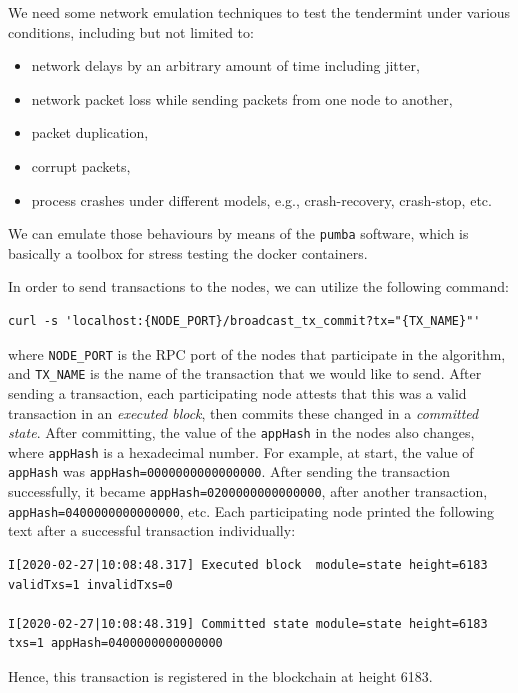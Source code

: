 \documentclass{article}
\begin{document}
We need some network emulation techniques to test the tendermint under various conditions, including but not limited to:

\begin{itemize}
    \item network delays by an arbitrary amount of time including jitter,
    \item network packet loss while sending packets from one node to another,
    \item packet duplication,
    \item corrupt packets,
    \item process crashes under different models, e.g., crash-recovery, crash-stop, etc.
\end{itemize}

We can emulate those behaviours by means of the \texttt{pumba} software, which is basically a toolbox for stress testing the docker containers.

In order to send transactions to the nodes, we can utilize the following command:

\begin{lstlisting}
curl -s 'localhost:{NODE_PORT}/broadcast_tx_commit?tx="{TX_NAME}"'
\end{lstlisting}

where \texttt{NODE\_PORT} is the RPC port of the nodes that participate in the algorithm, and \texttt{TX\_NAME} is the name of the transaction that we would like to send. After sending a transaction, each participating node attests that this was a valid transaction in an \textit{executed block}, then commits these changed in a \textit{committed state}. After committing, the value of the \texttt{appHash} in the nodes also changes, where \texttt{appHash} is a hexadecimal number. For example, at start, the value of \texttt{appHash} was \texttt{appHash=0000000000000000}. After sending the transaction successfully, it became \texttt{appHash=0200000000000000}, after another transaction, \texttt{appHash=0400000000000000}, etc. Each participating node printed the following text after a successful transaction individually:

\begin{lstlisting}
I[2020-02-27|10:08:48.317] Executed block  module=state height=6183 validTxs=1 invalidTxs=0

I[2020-02-27|10:08:48.319] Committed state module=state height=6183 txs=1 appHash=0400000000000000
\end{lstlisting}

Hence, this transaction is registered in the blockchain at height 6183.
\end{document}
